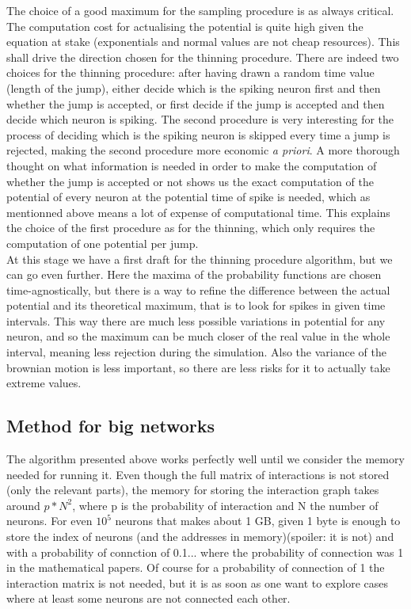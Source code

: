 \documentclass{report}
\begin{document}
	The choice of a good maximum for the sampling procedure is as always critical. The computation cost for actualising the potential is quite high given the equation at stake (exponentials and normal values are not cheap resources). This shall drive the direction chosen for the thinning procedure. There are indeed two choices for the thinning procedure: after having drawn a random time value (length of the jump), either decide which is the spiking neuron first and then whether the jump is accepted, or first decide if the jump is accepted and then decide which neuron is spiking. The second procedure is very interesting for the process of deciding which is the spiking neuron is skipped every time a jump is rejected, making the second procedure more economic \emph{a priori}. A more thorough thought on what information is needed in order to make the computation of whether the jump is accepted or not shows us the exact computation of the potential of every neuron at the potential time of spike is needed, which as mentionned above means a lot of expense of computational time. This explains the choice of the first procedure as for the thinning, which only requires the computation of one potential per jump.\\

	At this stage we have a first draft for the thinning procedure algorithm, but we can go even further. Here the maxima of the probability functions are chosen time-agnostically, but there is a way to refine the difference between the actual potential and its theoretical maximum, that is to look for spikes in given time intervals. This way there are much less possible variations in potential for any neuron, and so the maximum can be much closer of the real value in the whole interval, meaning less rejection during the simulation. Also the variance of the brownian motion is less important, so there are less risks for it to actually take extreme values.\\
\subsection{Method for big networks}
	The algorithm presented above works perfectly well until we consider the memory needed for running it. Even though the full matrix of interactions is not stored (only the relevant parts), the memory for storing the interaction graph takes around $p*N^2$, where p is the probability of interaction and N the number of neurons. For even $10^5$ neurons that makes about 1 GB, given 1 byte is enough to store the index of neurons (and the addresses in memory)(spoiler: it is not) and with a probability of connction of 0.1... where the probability of connection was 1 in the mathematical papers. Of course for a probability of connection of 1 the interaction matrix is not needed, but it is as soon as one want to explore cases where at least some neurons are not connected each other.\\
\end{document}
